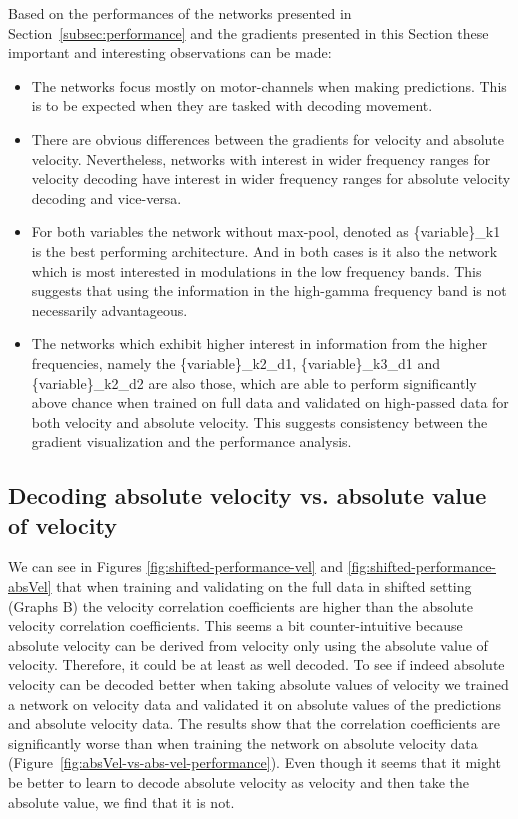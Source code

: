 Based on the performances of the networks presented in Section~\ref{subsec:performance} and the gradients presented in this Section these important and interesting observations can be made:

\begin{itemize}
    \item The networks focus mostly on motor-channels when making predictions.
This is to be expected when they are tasked with decoding movement.
    \item There are obvious differences between the gradients for velocity and absolute velocity.
    Nevertheless, networks with interest in wider frequency ranges for velocity decoding have interest in wider frequency ranges for absolute velocity decoding and vice-versa.
    \item For both variables the network without max-pool, denoted as \{variable\}\_k1 is the best performing architecture.
    And in both cases is it also the network which is most interested in modulations in the low frequency bands.
    This suggests that using the information in the high-gamma frequency band is not necessarily advantageous.
    \item The networks which exhibit higher interest in information from the higher frequencies, namely the \{variable\}\_k2\_d1, \{variable\}\_k3\_d1 and \{variable\}\_k2\_d2 are also those, which are able to perform significantly above chance when trained on full data and validated on high-passed data for both velocity and absolute velocity.
    This suggests consistency between the gradient visualization and the performance analysis.

\end{itemize}

\subsection{Decoding absolute velocity vs. absolute value of velocity}
We can see in Figures \ref{fig:shifted-performance-vel} and \ref{fig:shifted-performance-absVel} that when training and validating on the full data in shifted setting (Graphs B) the velocity correlation coefficients are higher than the absolute velocity correlation coefficients. 
This seems a bit counter-intuitive because absolute velocity can be derived from velocity only using the absolute value of velocity. 
Therefore, it could be at least as well decoded.
To see if indeed absolute velocity can be decoded better when taking absolute values of velocity we trained a network on velocity data and validated it on absolute values of the predictions and absolute velocity data.
The results show that the correlation coefficients are significantly worse than when training the network on absolute velocity data (Figure~\ref{fig:absVel-vs-abs-vel-performance}). Even though it seems that it might be better to learn to decode absolute velocity as velocity and then take the absolute value, we find that it is not. 

